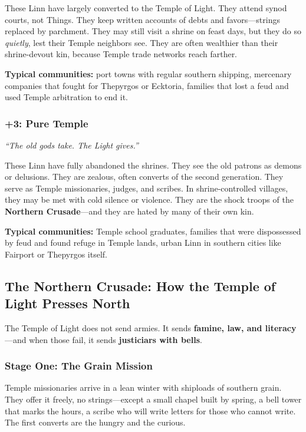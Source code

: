 \documentclass[11pt]{article}
\begin{document}
These Linn have largely converted to the Temple of Light. They attend synod courts, not Things. They keep written accounts of debts and favors---strings replaced by parchment. They may still visit a shrine on feast days, but they do so \textit{quietly}, lest their Temple neighbors see. They are often wealthier than their shrine-devout kin, because Temple trade networks reach farther.

\textbf{Typical communities:} port towns with regular southern shipping, mercenary companies that fought for Thepyrgos or Ecktoria, families that lost a feud and used Temple arbitration to end it.

\subsubsection{+3: Pure Temple}

\emph{``The old gods take. The Light gives.''}

These Linn have fully abandoned the shrines. They see the old patrons as demons or delusions. They are zealous, often converts of the second generation. They serve as Temple missionaries, judges, and scribes. In shrine-controlled villages, they may be met with cold silence or violence. They are the shock troops of the \textbf{Northern Crusade}---and they are hated by many of their own kin.

\textbf{Typical communities:} Temple school graduates, families that were dispossessed by feud and found refuge in Temple lands, urban Linn in southern cities like Fairport or Thepyrgos itself.

\subsection{The Northern Crusade: How the Temple of Light Presses North}

The Temple of Light does not send armies. It sends \textbf{famine, law, and literacy}---and when those fail, it sends \textbf{justiciars with bells}.

\subsubsection{Stage One: The Grain Mission}

Temple missionaries arrive in a lean winter with shiploads of southern grain. They offer it freely, no strings---except a small chapel built by spring, a bell tower that marks the hours, a scribe who will write letters for those who cannot write. The first converts are the hungry and the curious.
\end{document}
